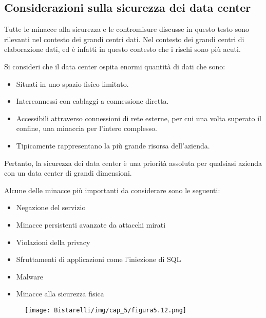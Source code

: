 \subsection{Considerazioni sulla sicurezza dei data center}
Tutte le minacce alla sicurezza e le contromisure discusse in questo testo sono rilevanti nel contesto dei grandi centri dati. Nel contesto dei grandi centri di elaborazione dati, ed è infatti in questo contesto che i rischi
sono più acuti.

\singlespacing

Si consideri che il data center ospita enormi quantità di dati che sono:

\begin{itemize}
    \item Situati in uno spazio fisico limitato.
    
    \item Interconnessi con cablaggi a connessione diretta.
    
    \item Accessibili attraverso connessioni di rete esterne, per cui una volta superato il confine, una  minaccia per l'intero complesso.
    
    \item Tipicamente rappresentano la più grande risorsa dell'azienda.
\end{itemize}
Pertanto, la sicurezza dei data center è una priorità assoluta per qualsiasi azienda con un data center di grandi dimensioni.

\singlespacing

Alcune delle minacce più importanti da considerare sono le seguenti:

\begin{itemize}
    \item Negazione del servizio
    
    \item Minacce persistenti avanzate da attacchi mirati
    
    \item Violazioni della privacy
    
    \item Sfruttamenti di applicazioni come l'iniezione di SQL
    
    \item Malware
    
    \item Minacce alla sicurezza fisica
\end{itemize}

\begin{figure}[H]
	\centering
    \texttt{[image: Bistarelli/img/cap\_5/figura5.12.png]}
\end{figure}

